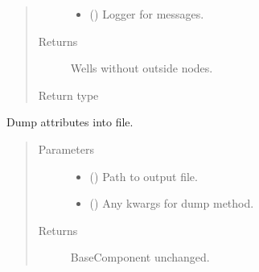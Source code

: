 \documentclass[letterpaper,10pt,english]{sphinxmanual}
\begin{document}
\begin{fulllineitems}
\begin{fulllineitems}
\begin{quote}
\begin{description}
\begin{itemize}
\item {} 
 (\sphinxstyleliteralemphasis{\sphinxupquote{, }}) \textendash{} Logger for messages.

\end{itemize}

\item[{Returns}] \leavevmode
{} \textendash{} Wells without outside nodes.

\item[{Return type}] \leavevmode
{\hyperref[\detokenize{api/wells:geology.src.wells.Wells}]{}}

\end{description}\end{quote}

\end{fulllineitems}


\begin{fulllineitems}
\label{\detokenize{api/wells:geology.src.wells.Wells.dump}}
Dump attributes into file.
\begin{quote}\begin{description}
\item[{Parameters}] \leavevmode\begin{itemize}
\item {} 
 () \textendash{} Path to output file.

\item {} 
 (\sphinxstyleliteralemphasis{\sphinxupquote{, }}) \textendash{} Any kwargs for dump method.

\end{itemize}

\item[{Returns}] \leavevmode
{} \textendash{} BaseComponent unchanged.


\end{description}
\end{quote}
\end{fulllineitems}
\end{fulllineitems}
\end{document}

